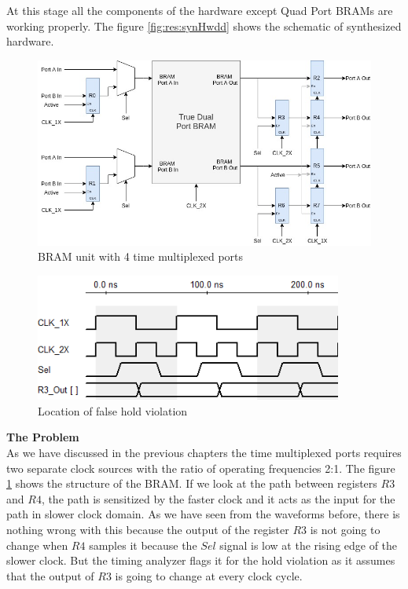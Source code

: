 At this stage all the components of the hardware except Quad Port BRAMs are working 
properly. The figure \ref{fig:res:synHwdd} shows the schematic of synthesized hardware.


\begin{figure}
    \centering
    \includegraphics[width = 0.9\linewidth]{./Results/quadPortBRAM.jpg}
    \caption{BRAM unit with 4 time multiplexed ports}
    \label{fig:res:bram}
\end{figure}

\begin{figure}
    \centering
    \includegraphics[width = 0.9\textwidth]{./Results/bramWaveProblem.png}
    \caption{Location of false hold violation}
    \label{fig:res:wave}
\end{figure}

\textbf{The Problem}\\
As we have discussed in the previous chapters the time multiplexed ports requires 
two separate clock sources with the ratio of operating frequencies 2:1. The figure 
\ref{fig:res:bram} shows the structure of the BRAM. If we look at the path between
registers $R3$ and $R4$, the path is sensitized by the faster clock and it 
acts as the input for the path in slower clock domain. As we have seen from the 
waveforms before, there is nothing wrong with this because the output of the 
register $R3$ is not going to change when $R4$ samples it because the $Sel$ signal
is low at the rising edge of the slower clock. But the timing analyzer flags it for the 
hold violation as it assumes that the output of $R3$ is going to change at every clock
cycle. 







